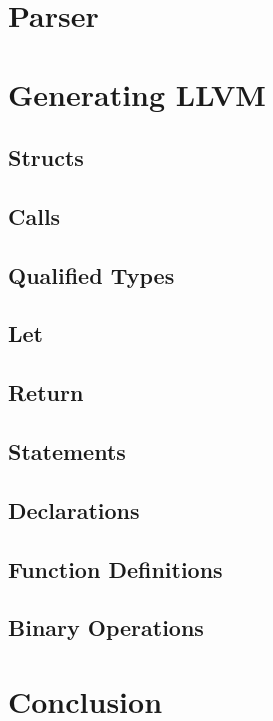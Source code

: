 \documentclass[journal=jacsat, manuscript=article]{achemso}
\begin{document}
\section{Parser}

\section{Generating LLVM}
\subsection{Structs}
\subsection{Calls}
\subsection{Qualified Types}
\subsection{Let}
\subsection{Return}
\subsection{Statements}
\subsection{Declarations}
\subsection{Function Definitions}
\subsection{Binary Operations}

\section{Conclusion}
\end{document}
